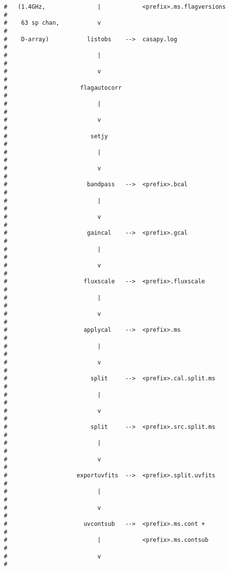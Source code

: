 \begin{verbatim}
#   (1.4GHz,               |            <prefix>.ms.flagversions         #
#    63 sp chan,           v                                             #
#    D-array)           listobs    -->  casapy.log                       #
#                          |                                             #
#                          v                                             #
#                     flagautocorr                                       #
#                          |                                             #
#                          v                                             #
#                        setjy                                           #
#                          |                                             #
#                          v                                             #
#                       bandpass   -->  <prefix>.bcal                    #
#                          |                                             #
#                          v                                             #
#                       gaincal    -->  <prefix>.gcal                    #
#                          |                                             #
#                          v                                             #
#                      fluxscale   -->  <prefix>.fluxscale               #
#                          |                                             #
#                          v                                             #
#                      applycal    -->  <prefix>.ms                      #
#                          |                                             #
#                          v                                             #
#                        split     -->  <prefix>.cal.split.ms            #
#                          |                                             #
#                          v                                             #
#                        split     -->  <prefix>.src.split.ms            #
#                          |                                             #
#                          v                                             #
#                    exportuvfits  -->  <prefix>.split.uvfits            #
#                          |                                             #
#                          v                                             #
#                      uvcontsub   -->  <prefix>.ms.cont +               #
#                          |            <prefix>.ms.contsub              #
#                          v                                             #

\end{verbatim}
